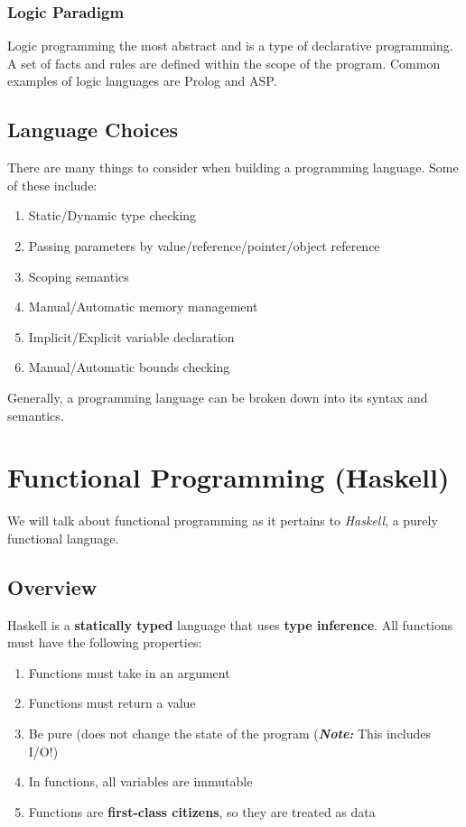 \documentclass{article}
\begin{document}
\subsubsection{Logic Paradigm} Logic programming the most abstract and is
a type of declarative programming. A set of facts and rules are
defined within the scope of the program. Common examples of logic
languages are Prolog and ASP.





\subsection{Language Choices} There are many things to consider when
building a programming language. Some of these include:
\begin{enumerate}[label=(\roman*),align=left]
\item Static/Dynamic type checking
\item Passing parameters by value/reference/pointer/object reference
\item Scoping semantics
\item Manual/Automatic memory management
\item Implicit/Explicit variable declaration
\item Manual/Automatic bounds checking
\end{enumerate} Generally, a programming language can be broken down
into its syntax and semantics.





\section{Functional Programming (Haskell)} We will talk about
functional programming as it pertains to \textit{Haskell}, a purely
functional language. 





\subsection{Overview} Haskell is a \textbf{statically typed} language
that uses \textbf{type inference}. All functions must have the
following properties: 
\begin{enumerate}[label=(\roman*),align=left]
\item Functions must take in an argument
\item Functions must return a value
\item Be pure (does not change the state of the program
(\textit{\textbf{Note:}} This includes I/O!)
\item In functions, all variables are immutable
\item Functions are \textbf{first-class citizens}, so they are treated
as data
\end{enumerate}
\end{document}
